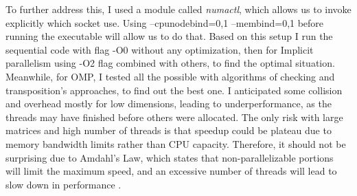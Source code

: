 To further address this, I used a module called \textit{numactl}, which allows us to invoke explicitly which socket use. Using --cpunodebind=0,1 --membind=0,1 before running the executable will allow us to do that.
Based on this setup I run the sequential code with flag -O0 without any optimization, then for Implicit parallelism using -O2 flag combined with others, to find the optimal situation. Meanwhile, for OMP, I tested all the possible with algorithms of checking and transposition’s approaches, to find out the best one. I anticipated some collision and overhead mostly for low dimensions, leading to underperformance, as the threads may have finished before others were allocated. The only risk with large matrices and high number of threads is that speedup could be plateau due to memory bandwidth limits rather than CPU capacity. Therefore, it should not be surprising due to Amdahl's Law, which states that non-parallelizable portions will limit the maximum speed, and an excessive number of threads will lead to slow down in performance \cite{amdahls-law}.  
